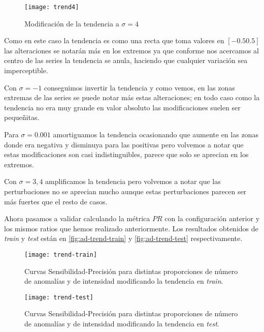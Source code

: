 \begin{figure}[htpb]
  \centering
  \texttt{[image: trend4]}
  \caption{Modificación de la tendencia a $\sigma = 4$}
  \label{fig:ad-trend4}
\end{figure}

Como en este caso la tendencia es como una recta que toma valores en $[-0.5 0.5]$ las alteraciones se notarán más en los extremos ya que conforme nos acercamos al centro de las series la tendencia se anula, haciendo que cualquier variación sea imperceptible.

Con $\sigma = -1$ conseguimos invertir la tendencia y como vemos, en las zonas extremas de las series se puede notar más estas alteraciones; en todo caso como la tendencia no era muy grande en valor absoluto las modificaciones suelen ser pequeñitas.

Para $\sigma = 0.001$ amortiguamos la tendencia ocasionando que aumente en las zonas donde era negativa y disminuya para las positivas pero volvemos a notar que estas modificaciones son casi indistinguibles, parece que solo se aprecian en los extremos.

Con $\sigma = 3, 4$ amplificamos la tendencia pero volvemos a notar que las perturbaciones no se aprecian mucho aunque estas perturbaciones parecen ser más fuertes que el resto de casos.

Ahora pasamos a validar calculando la métrica $PR$ con la configuración anterior y los mismos ratios que hemos realizado anteriormente. Los resultados obtenidos de \emph{train} y \emph{test} están en \autoref{fig:ad-trend-train} y \autoref{fig:ad-trend-test} respectivamente.

\begin{figure}[htpb]
  \centering
  \texttt{[image: trend-train]}
  \caption{Curvas Sensibilidad-Precisión para distintas proporciones de número de anomalías y de intensidad modificando la tendencia en \emph{train}.}
  \label{fig:ad-trend-train}
\end{figure}

\begin{figure}[htpb]
  \centering
  \texttt{[image: trend-test]}
  \caption{Curvas Sensibilidad-Precisión para distintas proporciones de número de anomalías y de intensidad modificando la tendencia en \emph{test}.}
  \label{fig:ad-trend-test}
\end{figure}

